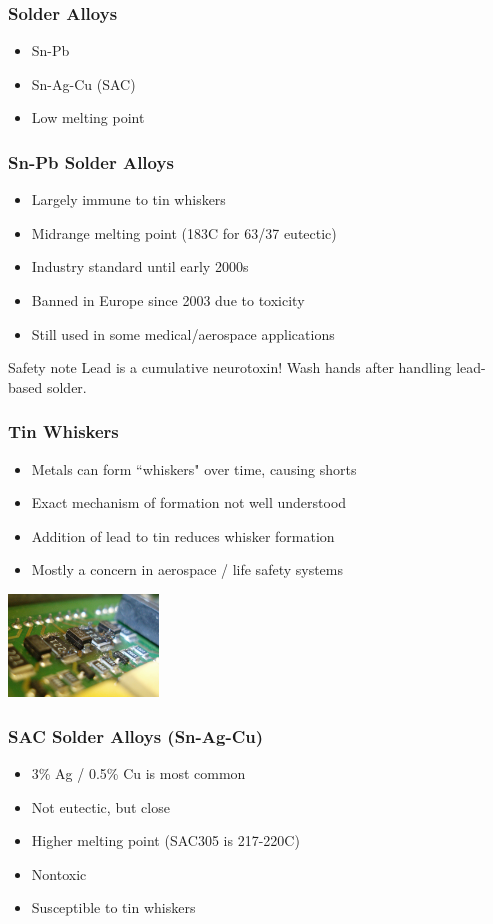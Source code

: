\documentclass{beamer}
\begin{document}
\begin{frame}
\frametitle{Solder Alloys}
\begin{itemize}
\item Sn-Pb
\item Sn-Ag-Cu (SAC)
\item Low melting point
\end{itemize}
\end{frame}

\begin{frame}
\frametitle{Sn-Pb Solder Alloys}
\begin{itemize}
\item Largely immune to tin whiskers
\item Midrange melting point (183C for 63/37 eutectic)
\item Industry standard until early 2000s
\item Banned in Europe since 2003 due to toxicity
\item Still used in some medical/aerospace applications
\end{itemize}
\begin{alertblock}{Safety note}
Lead is a cumulative neurotoxin! Wash hands after handling lead-based solder.
\end{alertblock}
\end{frame}

\begin{frame}
\frametitle{Tin Whiskers}
\begin{itemize}
\item Metals can form ``whiskers" over time, causing shorts
\item Exact mechanism of formation not well understood
\item Addition of lead to tin reduces whisker formation
\item Mostly a concern in aerospace / life safety systems
\end{itemize}
\begin{center}
\includegraphics[width=4cm,keepaspectratio]{whiskers.jpg}
\end{center}
\end{frame}

\begin{frame}
\frametitle{SAC Solder Alloys (Sn-Ag-Cu)}
\begin{itemize}
\item 3\% Ag / 0.5\% Cu is most common
\item Not eutectic, but close
\item Higher melting point (SAC305 is 217-220C)
\item Nontoxic
\item Susceptible to tin whiskers
\end{itemize}
\end{frame}
\end{document}
